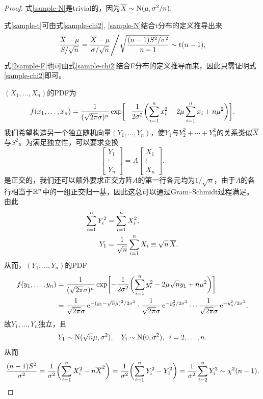 \begin{proof}
	式\eqref{sample-N}是trivial的，因为$\overline{X} \sim \operatorname{N}(\mu,\sigma^2/n).$
	
	式\eqref{sample-t}可由式\eqref{sample-chi2}, \eqref{sample-N}结合t分布的定义推导出来
	\[
		\frac{\overline{X} - \mu}{S/\sqrt n} = {\frac{\overline{X} - \mu}{\sigma/\sqrt n}}\Bigg/{\sqrt{\frac{(n - 1)S^2/\sigma^2}{n - 1}}} \sim \operatorname{t}(n - 1),
	\]
	式\eqref{2sample-F}也可由式\eqref{sample-chi2}结合F分布的定义推导而来，因此只需证明式\eqref{sample-chi2}即可。

	$(X_1,\ldots,X_n)$的PDF为
	\[
		f(x_1,\ldots,x_n) = \frac1{(\sqrt{2\pi}\sigma)^n}\exp\biggl[-\frac1{2\sigma^2}\biggl(\sum_{i=1}^nx_i^2 - 2\mu\sum_{i=1}^nx_i + n\mu^2\biggr)\biggr].
	\]
	我们希望构造另一个独立随机向量$(Y_1,\ldots,Y_n)$，使$Y_1$与$Y_2^2 + \cdots + Y_n^2$的关系类似$\overline{X}$与$S^2$。为满足独立性，可以要求变换
	\[
		\begin{bmatrix}
			Y_1\\\vdots\\Y_n
		\end{bmatrix} = A\begin{bmatrix}
			X_1\\\vdots\\X_n
		\end{bmatrix}.
	\]
	是正交的，我们还可以额外要求正交方阵$A$的第一行各元均为$1/\sqrt n$，由于$A$的各行相当于$\mathbb{R}^n$中的一组正交归一基，因此这总可以通过Gram--Schmidt过程满足。
	由此
	\begin{align*}
		\sum_{i=1}^nY_i^2 &= \sum_{i=1}^nX_i^2,\\
		Y_1 &= \frac1{\sqrt n}\sum_{i=1}^nX_i \equiv \sqrt n\,\overline{X}.
	\end{align*}
	从而，$(Y_1,\ldots,Y_n)$的PDF
	\begin{align*}
		f(y_1,\ldots,y_n) &= \frac1{(\sqrt{2\pi}\sigma)^n}\exp\biggl[-\frac1{2\sigma^2}\biggl(\sum_{i=1}^ny_i^2 - 2\mu\sqrt ny_1 + n\mu^2\biggr)\biggr]\\
		&= \frac1{\sqrt{2\pi}\sigma}\mathop{}\!\mathrm{e}^{-(y_1-\sqrt n\mu)^2/2\sigma^2} \cdot \frac1{\sqrt{2\pi}\sigma}\mathop{}\!\mathrm{e}^{-y_2^2/2\sigma^2}\cdots\frac1{\sqrt{2\pi}\sigma}\mathop{}\!\mathrm{e}^{-y_n^2/2\sigma^2}.
	\end{align*}
	故$Y_1,\ldots,Y_n$独立，且
	\[
		Y_1 \sim \operatorname{N}(\sqrt n\mu,\sigma^2),\quad Y_i \sim \operatorname{N}(0,\sigma^2),\enspace i = 2,\ldots,n.
	\]
	从而
	\[
		\frac{(n - 1)S^2}{\sigma^2}
		= \frac1{\sigma^2}\biggl(\sum_{i=1}^nX_i^2 - n\overline{X}^2\biggr)
		= \frac1{\sigma^2}\biggl(\sum_{i=1}^nY_i^2 - Y_1^2\biggr)
		= \frac1{\sigma^2}\sum_{i=2}^nY_i^2 \sim \chi^2(n - 1).
		\qedhere
	\]
\end{proof}
